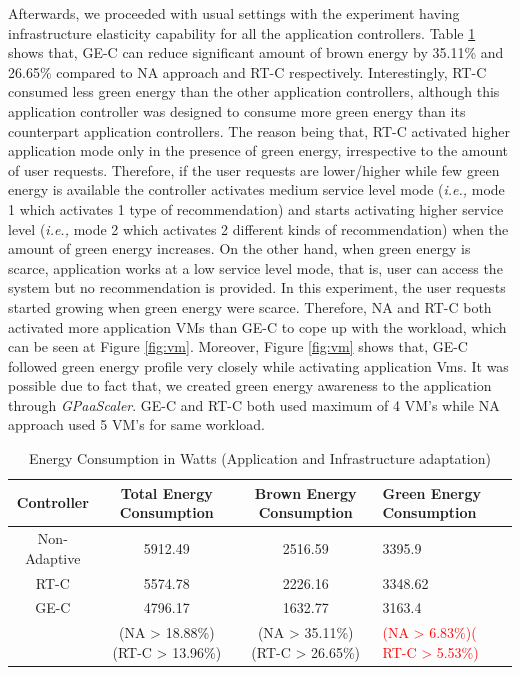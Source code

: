 Afterwards, we proceeded with usual settings with the experiment having infrastructure elasticity capability for all the application controllers. Table \ref{tab:watt2} shows that, GE-C can reduce significant amount of brown energy by 35.11\% and 26.65\% compared to NA approach and RT-C respectively. Interestingly, RT-C consumed less green energy than the other application controllers, although this application controller was designed to consume more green energy than its counterpart application controllers. The reason being that, RT-C activated higher application mode  only in the presence of green energy, irrespective to the amount of user requests. Therefore, if the user requests are lower/higher while few green energy is available the controller activates medium service level mode
 (\emph{i.e.,} mode 1 which activates 1 type of recommendation) and starts activating higher service level (\emph{i.e.,} mode 2 which activates 2 different kinds of recommendation) when the amount of green energy increases. On the other hand, when green energy is scarce, application works at a low service level mode, that is, user can access the system but no recommendation is provided. In this experiment, the user requests started growing when green energy were scarce. Therefore, NA and RT-C both activated more application VMs than GE-C to cope up with the workload, which can be seen at Figure \ref{fig:vm}. Moreover, Figure \ref{fig:vm} shows that, GE-C followed green energy profile very closely while activating application Vms. It was possible due to fact that, we created green energy awareness to the application through \emph{GPaaScaler}. GE-C and RT-C both used maximum of 4 VM's while NA approach used 5 VM's for same workload.



\begin{table}
\caption{Energy Consumption in Watts (Application and Infrastructure adaptation)}
  \label{tab:watt2}
\begin{tabular}{cccl}
\toprule
Controller & Total Energy Consumption & Brown Energy Consumption & Green Energy Consumption\\
\midrule
Non-Adaptive & 5912.49 & 2516.59 & 3395.9 \\
RT-C & 5574.78 & 2226.16 & 3348.62  \\  %
GE-C & 4796.17 & 1632.77  & 3163.4  \\
   & (NA > 18.88\%)(RT-C > 13.96\%) & (NA > 35.11\%) (RT-C > 26.65\%) & \textcolor{red}{(NA > 6.83\%)( RT-C > 5.53\%)} \\
\bottomrule
\end{tabular}
\end{table}

